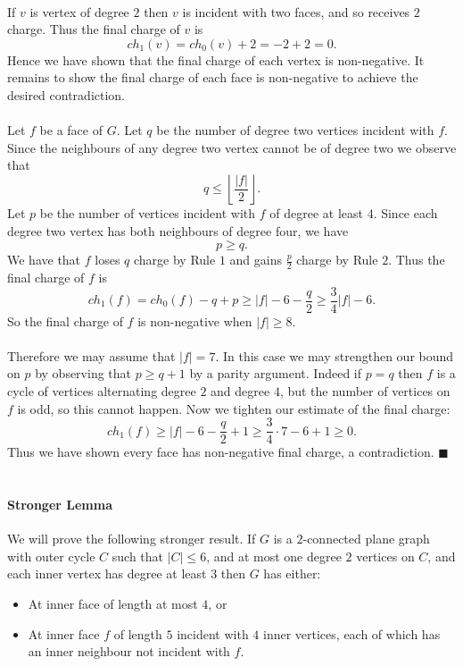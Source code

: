 \documentclass[letterpaper,12pt,oneside,onecolumn]{article}
\newcommand{\floor}[1]{\ensuremath{\left\lfloor#1\right\rfloor}}
\begin{document}
\paragraph{}
If $v$ is vertex of degree $2$ then $v$ is incident with two faces, and so receives $2$ charge. Thus the final charge of $v$ is
$$ch_1(v) = ch_0(v) + 2 = -2 + 2 = 0.$$
Hence we have shown that the final charge of each vertex is non-negative. It remains to show the final charge of each face is non-negative to achieve the desired contradiction.
\paragraph{}
Let $f$ be a face of $G$. Let $q$ be the number of degree two vertices incident with $f$. Since the neighbours of any degree two vertex cannot be of degree two we observe that
$$q \leq \floor{\frac{|f|}{2}}.$$
Let $p$ be the number of vertices incident with $f$ of degree at least $4$. Since each degree two vertex has both neighbours of degree four, we have
$$p \geq q.$$
We have that $f$ loses $q$ charge by Rule $1$ and gains $\frac{p}{2}$ charge by Rule $2.$ Thus the final charge of $f$ is
$$ch_1(f) = ch_0(f) -q + p \geq |f| -6 -\frac{q}{2} \geq \frac{3}{4}|f| - 6.$$
So the final charge of $f$ is non-negative when $|f| \geq 8$.
\paragraph{}
Therefore we may assume that $|f| = 7$. In this case we may strengthen our bound on $p$ by observing that
$p \geq q+1$
by a parity argument. Indeed if $p = q$ then $f$ is a cycle of vertices alternating degree $2$ and degree $4$, but the number of vertices on $f$ is odd, so this cannot happen. Now we tighten our estimate of the final charge:
$$ch_1(f) \geq |f| - 6 -\frac{q}{2} + 1 \geq \frac{3}{4}\cdot 7 - 6 + 1 \geq 0.$$
Thus we have shown every face has non-negative final charge, a contradiction. $\blacksquare$

\newpage
\section{}
\paragraph{Stronger Lemma}
We will prove the following stronger result. If $G$ is a $2$-connected plane graph with outer cycle $C$ such that $|C| \leq 6$, and at most one degree $2$ vertices on $C$, and each inner vertex has degree at least $3$ then $G$ has either:
\begin{itemize}
	\item At inner face of length at most $4$, or
	\item At inner face $f$ of length $5$ incident with $4$ inner vertices, each of which has an inner neighbour not incident with $f$.
\end{itemize}
\end{document}
